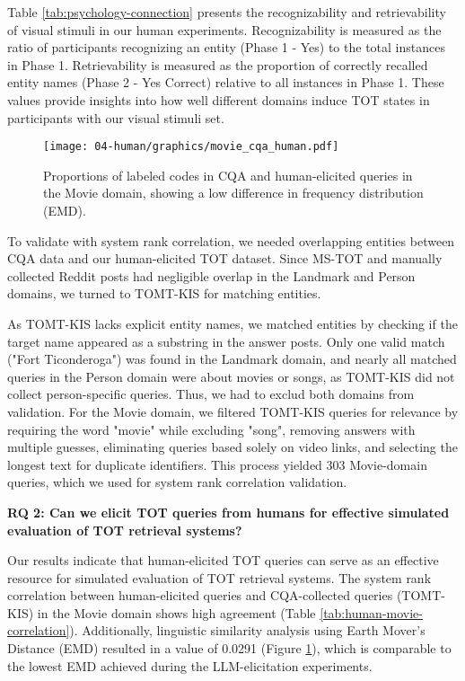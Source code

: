 Table \ref{tab:psychology-connection} presents the recognizability and retrievability of visual stimuli in our human experiments. Recognizability is measured as the ratio of participants recognizing an entity (Phase 1 - Yes) to the total instances in Phase 1. Retrievability is measured as the proportion of correctly recalled entity names (Phase 2 - Yes Correct) relative to all instances in Phase 1. These values provide insights into how well different domains induce TOT states in participants with our visual stimuli set.


\begin{figure} 
\centering
\texttt{[image: 04-human/graphics/movie\_cqa\_human.pdf]}
\caption{
Proportions of labeled codes in CQA and human-elicited queries in the Movie domain, showing a low difference in frequency distribution (EMD).
}
\label{fig:cqa-human-ling}
\end{figure}

To validate with system rank correlation, we needed overlapping entities between CQA data and our human-elicited TOT dataset. Since MS-TOT and manually collected Reddit posts had negligible overlap in the Landmark and Person domains, we turned to TOMT-KIS for matching entities.

As TOMT-KIS lacks explicit entity names, we matched entities by checking if the target name appeared as a substring in the answer posts. Only one valid match ("Fort Ticonderoga") was found in the Landmark domain, and nearly all matched queries in the Person domain were about movies or songs, as TOMT-KIS did not collect person-specific queries. Thus, we had to exclud both domains from validation.
%
For the Movie domain, we filtered TOMT-KIS queries for relevance by requiring the word "movie" while excluding "song", removing answers with multiple guesses, eliminating queries based solely on video links, and selecting the longest text for duplicate identifiers. This process yielded 303 Movie-domain queries, which we used for system rank correlation validation.



\textbf{RQ 2: Can we elicit TOT queries from humans for effective simulated evaluation of TOT retrieval systems?}


Our results indicate that human-elicited TOT queries can serve as an effective resource for simulated evaluation of TOT retrieval systems. The system rank correlation between human-elicited queries and CQA-collected queries (TOMT-KIS) in the Movie domain shows high agreement (Table \ref{tab:human-movie-correlation}).
%
Additionally, linguistic similarity analysis using Earth Mover’s Distance (EMD) resulted in a value of 0.0291 (Figure \ref{fig:cqa-human-ling}), which is comparable to the lowest EMD achieved during the LLM-elicitation experiments. 

